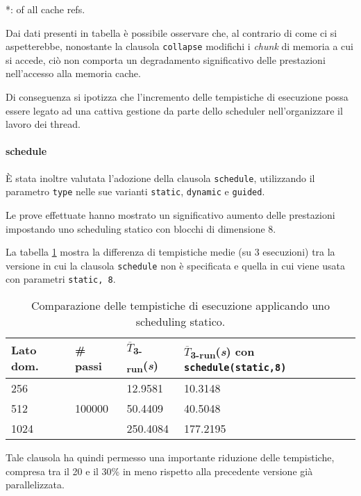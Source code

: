 *: of all cache refs.

Dai dati presenti in tabella è possibile osservare che, al contrario di come ci
si aspetterebbe, nonostante la clausola \texttt{collapse} modifichi i
\textit{chunk} di memoria a cui si accede, ciò non comporta un degradamento
significativo delle prestazioni nell'accesso alla memoria cache.

Di conseguenza si ipotizza che l'incremento delle tempistiche di esecuzione
possa essere legato ad una cattiva gestione da parte dello scheduler
nell'organizzare il lavoro dei thread.

\paragraph{schedule}

È stata inoltre valutata l'adozione della clausola \texttt{schedule},
utilizzando il parametro \texttt{type} nelle sue varianti \texttt{static},
\texttt{dynamic} e \texttt{guided}.

Le prove effettuate hanno mostrato un significativo aumento delle prestazioni
impostando uno scheduling statico con blocchi di dimensione 8.

La tabella \ref{tab:schedule} mostra la differenza di tempistiche medie (su 3
esecuzioni) tra la versione in cui la clausola \texttt{schedule} non è
specificata e quella in cui viene usata con parametri \texttt{static, 8}.

\begin{table}[ht]
\centering
\begin{tabularx}{400pt}{XXXX}
\toprule
Lato dom. & \# passi & $\overline{T}$\textsubscript{3-run}(\textit{s})&
$\overline{T}$\textsubscript{3-run}(\textit{s}) con \texttt{schedule(static,8)}\\
\midrule
 256 & \multirow{3}{*}{100000} & 12.9581 & 10.3148 \\
 512 && 50.4409 & 40.5048 \\
 1024 && 250.4084 & 177.2195 \\
\bottomrule
\end{tabularx}
\caption{\label{tab:schedule}Comparazione delle tempistiche di esecuzione
applicando uno scheduling statico.}
\end{table}

Tale clausola ha quindi permesso una importante riduzione delle tempistiche,
compresa tra il 20 e il 30\% in meno rispetto alla precedente versione già
parallelizzata.

